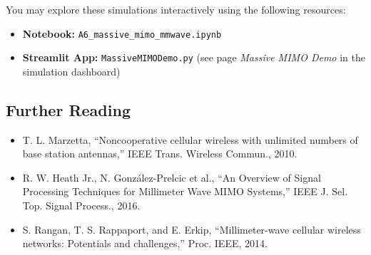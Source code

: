 You may explore these simulations interactively using the following resources:

\begin{itemize}
    \item \textbf{Notebook:} \texttt{A6\_massive\_mimo\_mmwave.ipynb}
    \item \textbf{Streamlit App:} \texttt{MassiveMIMODemo.py} (see page \textit{Massive MIMO Demo} in the simulation dashboard)
\end{itemize}

\subsection{Further Reading}

\begin{itemize}
    \item T. L. Marzetta, “Noncooperative cellular wireless with unlimited numbers of base station antennas,” IEEE Trans. Wireless Commun., 2010.
    \item R. W. Heath Jr., N. González-Prelcic et al., “An Overview of Signal Processing Techniques for Millimeter Wave MIMO Systems,” IEEE J. Sel. Top. Signal Process., 2016.
    \item S. Rangan, T. S. Rappaport, and E. Erkip, “Millimeter-wave cellular wireless networks: Potentials and challenges,” Proc. IEEE, 2014.
\end{itemize}

